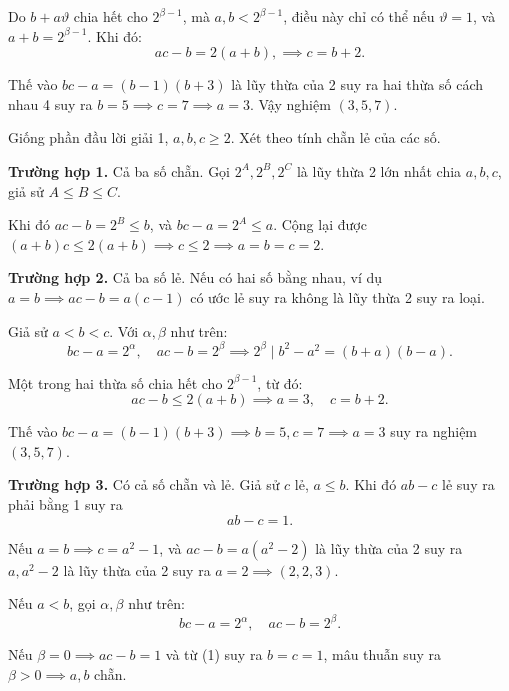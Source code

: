 \begin{problem}
\begin{soln}
    Do \( b + a\vartheta \) chia hết cho \( 2^{\beta - 1} \), mà \( a, b < 2^{\beta - 1} \),
    điều này chỉ có thể nếu \( \vartheta = 1 \), và \( a + b = 2^{\beta - 1} \). Khi đó:
    \[
        ac - b = 2(a + b), \implies c = b + 2.
    \]

    Thế vào \( bc - a = (b - 1)(b + 3) \) là lũy thừa của 2 suy ra hai thừa số cách nhau 4
    suy ra \( b = 5 \implies c = 7 \implies a = 3 \). Vậy nghiệm \( (3, 5, 7) \).
\end{soln}

\begin{soln}
    Giống phần đầu lời giải 1, \( a, b, c \ge 2 \). Xét theo tính chẵn lẻ của các số.

    \textbf{Trường hợp 1.} Cả ba số chẵn. Gọi \( 2^A, 2^B, 2^C \) là lũy thừa 2 lớn nhất chia \( a, b, c \), giả sử \( A \le B \le C \).

    Khi đó \( ac - b = 2^B \le b \), và \( bc - a = 2^A \le a \). Cộng lại được \( (a + b)c \le 2(a + b) \implies c \le 2 \implies a = b = c = 2 \).

    \textbf{Trường hợp 2.} Cả ba số lẻ. Nếu có hai số bằng nhau, ví dụ \( a = b \implies ac - b = a(c - 1) \) có ước lẻ suy ra không là lũy thừa 2 suy ra loại.

    Giả sử \( a < b < c \). Với \( \alpha, \beta \) như trên:
    \[
        bc - a = 2^\alpha, \quad ac - b = 2^\beta \implies 2^\beta \mid b^2 - a^2 = (b + a)(b - a).
    \]

    Một trong hai thừa số chia hết cho \( 2^{\beta - 1} \), từ đó:
    \[
        ac - b \le 2(a + b) \implies a = 3, \quad c = b + 2.
    \]
    
    Thế vào \( bc - a = (b - 1)(b + 3) \implies b = 5, c = 7 \implies a = 3 \) suy ra nghiệm \( (3, 5, 7) \).

    \textbf{Trường hợp 3.} Có cả số chẵn và lẻ. Giả sử \( c \) lẻ, \( a \le b \). Khi đó \( ab - c \) lẻ suy ra phải bằng 1 suy ra
    \[
        ab - c = 1. \tag{1}
    \]

    Nếu \( a = b \implies c = a^2 - 1 \), và \( ac - b = a(a^2 - 2) \) là lũy thừa của 2
    suy ra \( a, a^2 - 2 \) là lũy thừa của 2 suy ra \( a = 2 \implies (2, 2, 3) \).

    Nếu \( a < b \), gọi \( \alpha, \beta \) như trên:
    \[
        bc - a = 2^\alpha, \quad ac - b = 2^\beta. \tag{2}
    \]

    Nếu \( \beta = 0 \implies ac - b = 1 \) và từ (1) suy ra \( b = c = 1 \), mâu thuẫn suy ra \( \beta > 0 \implies a, b \) chẵn.


\end{soln}
\end{problem}
